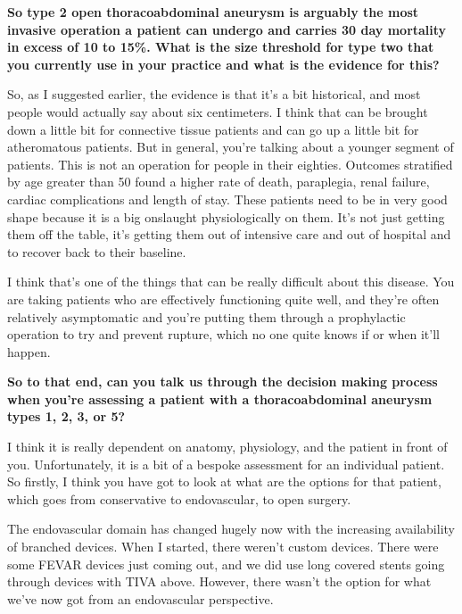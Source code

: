 \documentclass[
]{book}
\begin{document}
\textbf{So type 2 open thoracoabdominal aneurysm is arguably the most invasive
operation a patient can undergo and carries 30 day mortality in excess
of 10 to 15\%. What is the size threshold for type two that you currently
use in your practice and what is the evidence for this?}

So, as I suggested earlier, the evidence is that it's a bit historical,
and most people would actually say about six centimeters. I think that
can be brought down a little bit for connective tissue patients and can
go up a little bit for atheromatous patients. But in general, you're
talking about a younger segment of patients. This is not an operation
for people in their eighties. Outcomes stratified by age greater than 50
found a higher rate of death, paraplegia, renal failure, cardiac
complications and length of stay.\citep{coselli2017} These patients need to
be in very good shape because it is a big onslaught physiologically on
them. It's not just getting them off the table, it's getting them out of
intensive care and out of hospital and to recover back to their
baseline.

I think that's one of the things that can be really difficult about this
disease. You are taking patients who are effectively functioning quite
well, and they're often relatively asymptomatic and you're putting them
through a prophylactic operation to try and prevent rupture, which no
one quite knows if or when it'll happen.

\textbf{So to that end, can you talk us through the decision making process
when you're assessing a patient with a thoracoabdominal aneurysm types
1, 2, 3, or 5?}

I think it is really dependent on anatomy, physiology, and the patient
in front of you. Unfortunately, it is a bit of a bespoke assessment for
an individual patient. So firstly, I think you have got to look at what
are the options for that patient, which goes from conservative to
endovascular, to open surgery.

The endovascular domain has changed hugely now with the increasing
availability of branched devices. When I started, there weren't custom
devices. There were some FEVAR devices just coming out, and we did use
long covered stents going through devices with TIVA above. However,
there wasn't the option for what we've now got from an endovascular
perspective.
\end{document}
